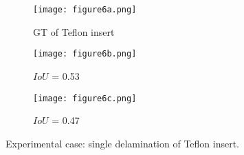 \begin{figure} [!h]
	\centering
	\begin{subfigure}[b]{0.32\textwidth}
		\centering
		\texttt{[image: figure6a.png]}
		\caption{GT of Teflon insert}
		\label{fig:exp_CFRP_teflon_3o_GT}
	\end{subfigure}
	\hfill
	\begin{subfigure}[b]{0.32\textwidth}
		\centering
		\texttt{[image: figure6b.png]}
		\caption{\(IoU\) = 0.53 } 
		\label{fig:model_1_CFRP_teflon_3o}
	\end{subfigure}
	\hfill
	\begin{subfigure}[b]{0.32\textwidth}
		\centering
		\texttt{[image: figure6c.png]}
		\caption{\(IoU\) = 0.47}
		\label{fig:model_2_CFRP_teflon_3o}
	\end{subfigure}
	\caption{Experimental case: single delamination of Teflon insert.}
	\label{fig:exp_Teflon_insert}
\end{figure} 

